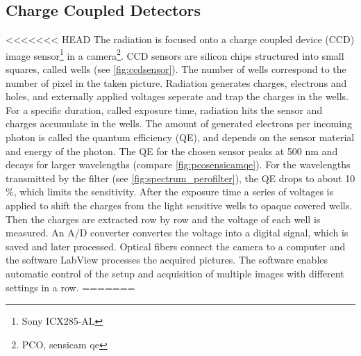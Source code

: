 \subsection{Charge Coupled Detectors}
<<<<<<< HEAD
The radiation is focused onto a charge coupled device (CCD) image sensor\footnote{Sony ICX285-AL} in a camera\footnote{PCO, sensicam qe}. CCD sensors are silicon chips structured into small squares, called wells \cite{SchnellCCD1993}(see \autoref{fig:ccdsensor}). The number of wells correspond to the number of pixel in the taken picture. Radiation generates charges, electrons and holes, and externally applied voltages seperate and trap the charges in the wells. For a specific duration, called exposure time, radiation hits the sensor and charges accumulate in the wells. The amount of generated electrons per incoming photon is called the quantum efficiency (QE), and depends on the sensor material and energy of the photon. The QE for the chosen sensor peaks at 500 nm and decays for larger wavelengths (compare \autoref{fig:pcosensicamqe}). For the wavelengths transmitted by the filter (see \autoref{fig:spectrum_perofilter}), the QE drops to about 10 \%, which limits the sensitivity. After the exposure time a series of voltages is applied to shift the charges from the light sensitive wells to opaque covered wells. Then the charges are extracted row by row and the voltage of each well is measured. An A/D converter convertes the voltage into a digital signal, which is saved and later processed. Optical fibers connect the camera to a computer and the software LabView processes the acquired pictures. The software enables automatic control of the setup and acquisition of multiple images with different settings in a row.
=======
